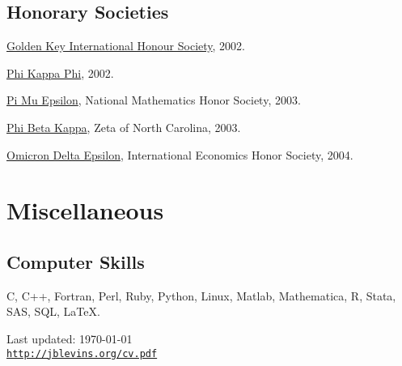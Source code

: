 \documentclass[letterpaper]{article}
\renewenvironment{itemize}{
  \begin{list}{}{
    \setlength{\leftmargin}{1em}
  }
}{
  \end{list}
}
\begin{document}
\subsection*{Honorary Societies}

\begin{itemize}
\item \href{http://www.goldenkey.org}{Golden Key International
    Honour Society}, 2002.
\item \href{http://www.phikappaphi.org/}{Phi Kappa Phi}, 2002.
\item \href{http://www.pme-math.org/}{Pi Mu Epsilon},
  National Mathematics Honor Society,
  2003.
\item \href{http://www.pbk.org/}{Phi Beta Kappa}, Zeta of North Carolina, 2003.
\item \href{http://www.cba.ua.edu/~ode/}{Omicron Delta Epsilon},
  International Economics Honor Society,
  2004.
\end{itemize}

\section*{Miscellaneous}

\subsection*{Computer Skills}

C, C++, Fortran, Perl, Ruby, Python, Linux,
Matlab, Mathematica, R, Stata, SAS, SQL, \LaTeX.

\bigskip

\begin{center}
\begin{footnotesize}
Last updated: \today \\
\href{http://jblevins.org/cv}{\tt http://jblevins.org/cv.pdf}
\end{footnotesize}
\end{center}
\end{document}

